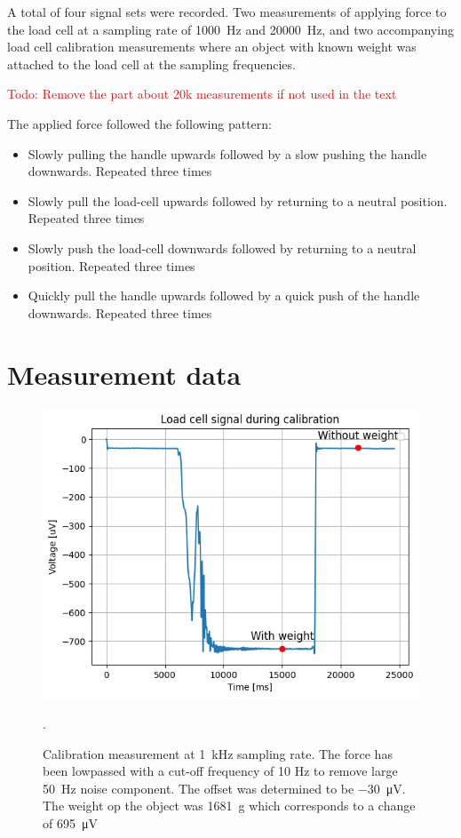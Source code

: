 A total of four signal sets were recorded. Two measurements of applying force to the load cell at a sampling rate of \SI{1000}{\hertz} and \SI{20000}{\hertz}, and two accompanying load cell calibration measurements where an object with known weight was attached to the load cell at the sampling frequencies.

\textcolor{red}{Todo: Remove the part about 20k measurements if not used in the text}

The applied force followed the following pattern:
\begin{itemize}
    \item Slowly pulling the handle upwards followed by a slow pushing the handle downwards. Repeated three times
    \item Slowly pull the load-cell upwards followed by returning to a neutral position. Repeated three times
    \item Slowly push the load-cell downwards followed by returning to a neutral position. Repeated three times
    \item Quickly pull the handle upwards followed by a quick push of the handle downwards. Repeated three times
\end{itemize}

\section{Measurement data}

\begin{figure}[h!t]
	\begin{center}
		\includegraphics[width=1.0\columnwidth]{images/measurement_calibratie3_1k.png}
	\end{center}
	\caption{Calibration measurement at \SI{1}{\kilo\hertz} sampling rate. The force has been lowpassed with a cut-off frequency of 10 Hz to remove large \SI{50}{\hertz} noise component. The offset was determined to be \SI{-30}{\micro\volt}. The weight op the object was \SI{1681}{\gram} which corresponds to a change of \SI{695}{\micro\volt}}.
	\label{fig:calibration_1k}
\end{figure}

